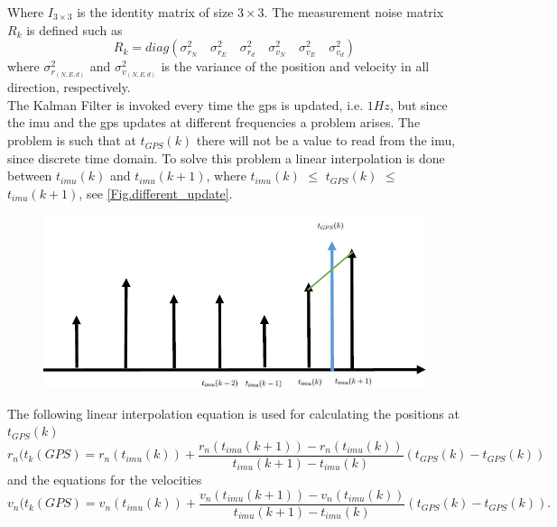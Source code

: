 Where $I_{3\times3}$ is the identity matrix of size $3\times 3$. The measurement noise matrix $R_k$ is defined such as 
\begin{equation}
R_k = diag(\sigma_{r_N}^2 \quad \sigma_{r_E}^2 \quad \sigma_{r_d}^2 \quad \sigma_{v_N}^2 \quad \sigma_{v_E}^2 \quad \sigma_{v_d}^2)
\end{equation}
where $\sigma_{r_{(N,E,d)}}^2$ and $\sigma_{v_{(N,E,d)}}^2$ is the variance of the position and velocity in all direction, respectively.\\

The Kalman Filter is invoked every time the \gls{gps} is updated, i.e. $1Hz$, but since the \gls{imu} and the \gls{gps} updates at different frequencies a problem arises. The problem is such that at $t_{GPS}(k)$ there will not be a value to read from the \gls{imu}, since discrete time domain. To solve this problem a linear interpolation is done between $t_{imu}(k)$ and $t_{imu}(k+1)$, where $t_{imu}(k)$ $\leq$ $t_{GPS}(k)$ $\leq$  $t_{imu}(k+1)$, see \autoref{Fig.different_update}.
\begin{figure}[H]
\centering
\includegraphics[width=.6\textwidth]{Figures/linear.png}
\label{Fig.different_update}
\end{figure}

The following linear interpolation equation is used for calculating the positions at $t_{GPS}(k)$
\begin{equation}
r_n(t_k(GPS) = r_n(t_{imu}(k)) + \frac{r_n(t_{imu}(k+1))-r_n(t_{imu}(k))}{t_{imu}(k+1)-t_{imu}(k)}(t_{GPS}(k)-t_{GPS}(k))
\end{equation}
 and the equations for the velocities 
 \begin{equation}
v_n(t_k(GPS) = v_n(t_{imu}(k)) + \frac{v_n(t_{imu}(k+1))-v_n(t_{imu}(k))}{t_{imu}(k+1)-t_{imu}(k)}(t_{GPS}(k)-t_{GPS}(k)).
\end{equation}
